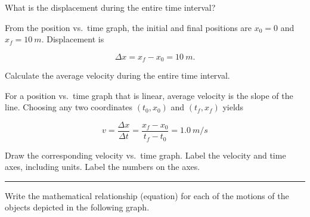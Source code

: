 \documentclass[dvipsnames]{exam}
\begin{document}
\begin{questions}
\question \label{25l8W}
What is the displacement during the entire time interval?

\begin{solution}
From the position vs.~time graph, the initial and final positions are $x_0=0$ and $x_f = \SI{10}{m}$. Displacement is

\begin{equation*}
    \Delta{x} = x_f - x_0 = \SI{10}{m}.
\end{equation*}
\end{solution}

\question \label{ques:runner_end} 
Calculate the average velocity during the entire time interval.

\begin{solution}
For a position vs.~time graph that is linear, average velocity is the slope of the line. Choosing any two coordinates $(t_0,x_0)$ and $(t_f,x_f)$ yields

\begin{equation*}
    v = \frac{\Delta{x}}{\Delta{t}} = \frac{x_f - x_0}{t_f - t_0} = \SI{1.0}{m/s}
\end{equation*}
\end{solution}

\question \label{BEhG4} 
Draw the corresponding velocity vs.~time graph. Label the velocity and time axes, including units. Label the numbers on the axes. 

\begin{solution}
\phantom{.}

\begin{center}
\end{center}
\end{solution}

\bigskip
\hrule

\question 
Write the mathematical relationship (equation) for each of the motions of the objects depicted in the following graph.


\end{questions}
\end{document}
